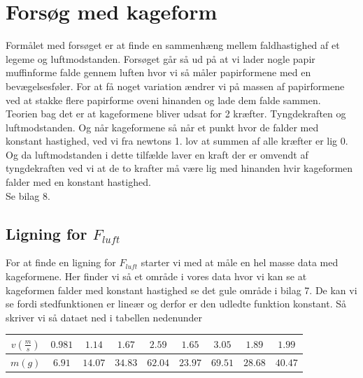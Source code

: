 \documentclass[12pt]{article}
\begin{document}
\section{Forsøg med kageform}
Formålet med forsøget er at finde en sammenhæng mellem faldhastighed af et legeme og luftmodstanden. Forsøget går så ud på at vi lader nogle papir muffinforme falde gennem luften
hvor vi så måler papirformene med en bevægelsesføler. For at få noget variation ændrer vi på massen af papirformene ved at stakke flere papirforme oveni hinanden og lade dem falde sammen.\\
Teorien bag det er at kageformene bliver udsat for 2 kræfter. Tyngdekraften og luftmodstanden. Og når kageformene så når et punkt hvor de falder med konstant hastighed, ved vi fra newtons 1. lov
at summen af alle kræfter er lig 0. Og da luftmodstanden i dette tilfælde laver en kraft der er omvendt af tyngdekraften ved vi at de to krafter må være lig med hinanden hvir kageformen falder med
en konstant hastighed.\\
Se bilag 8.

\subsection{Ligning for $F_{luft}$}
For at finde en ligning for $F_{luft}$ starter vi med at måle en hel masse data
med kageformene. Her finder vi så et område i vores data hvor vi kan se at kageformen
falder med konstant hastighed se det gule område i bilag 7. De kan vi se fordi stedfunktionen er lineær og derfor er
den udledte funktion konstant. Så skriver vi så dataet ned i tabellen nedenunder
\begin{center}
  \begin{tabular}{| c | c | c | c | c | c | c | c | c |}
        \hline
        $v(\frac{m}{s})$ & $0.981$ & $1.14$ & $1.67$ & $2.59$ & $1.65$ & $3.05$ & $1.89$ & $1.99$ \\
        \hline
        $m(g)$ & $6.91$ & $14.07$ & $34.83$ & $62.04$ & $23.97$ & $69.51$ & $28.68$ & $40.47$ \\
        \hline
  \end{tabular}
\end{center}
\end{document}
